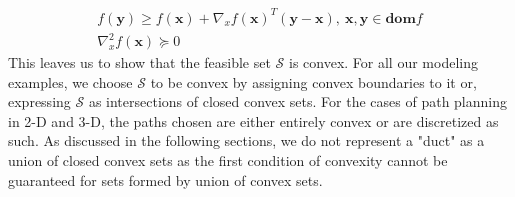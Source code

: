 \documentclass[12pt,a4]{article}
\begin{document}
\begin{align}
f(\textbf{y})\geq f(\textbf{x})+\nabla_xf(\textbf{x})^T(\textbf{y}-\textbf{x}),~ \textbf{x},\textbf{y}\in \textbf{dom}f \label{eq:first_ord_convx}\\
\nabla^2_x f(\textbf{x})\succeq 0 \label{eq:sec_ord_convx}
\end{align}
This leaves us to show that the feasible set $\mathcal{S}$ is convex. For all our modeling examples, we choose $\mathcal{S}$ to be convex by assigning convex boundaries to it or, expressing $\mathcal{S}$ as intersections of closed convex sets. For the cases of path planning in 2-D and 3-D, the paths chosen are either entirely convex or are discretized as such. As discussed in the following sections, we do not represent a "duct" as a union of closed convex sets as the first condition of convexity cannot be guaranteed for sets formed by union of convex sets. 
\end{document}
